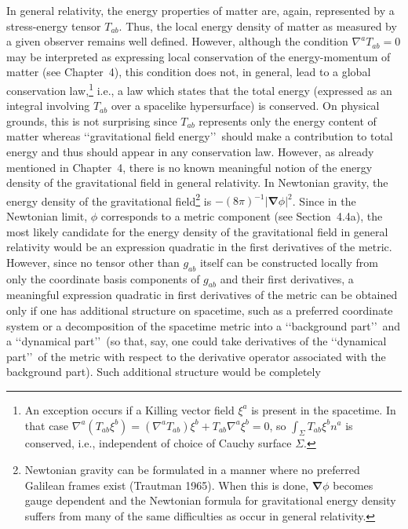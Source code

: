 In general relativity, the energy properties of matter are, again, represented by a
stress-energy tensor \(T_{ab}\). Thus, the local energy density of matter as measured
by a given observer remains well defined. However, although the condition
\(\nabla^aT_{ab}=0\) may be interpreted as expressing local conservation of the
energy-momentum of matter (see Chapter~4), this condition does not, in general, lead
to a global conservation law,\footnote{An exception occurs if a Killing vector field
\(\xi^a\) is present in the spacetime. In that case
\(\nabla^a(T_{ab}\xi^b)=(\nabla^aT_{ab})\xi^b+T_{ab}\nabla^a\xi^b=0\), so
\(\int_\Sigma T_{ab}\xi^bn^a\) is conserved, i.e., independent of choice of Cauchy
surface \(\Sigma\).} i.e., a law which states that the total energy (expressed as an
integral involving \(T_{ab}\) over a spacelike hypersurface) is conserved. On
physical grounds, this is not surprising since \(T_{ab}\) represents only the energy
content of matter whereas \lq\lq gravitational field energy\rq\rq\ should make a
contribution to total energy and thus should appear in any conservation law. However,
as already mentioned in Chapter~4, there is no known meaningful notion of the
energy density of the gravitational field in general relativity. In Newtonian gravity,
the energy density of the gravitational field\footnote{Newtonian gravity can be
formulated in a manner where no preferred Galilean frames exist (Trautman 1965).
When this is done, \(\boldsymbol{\nabla}\phi\) becomes gauge dependent and the Newtonian
formula for gravitational energy density suffers from many of the same difficulties
as occur in general relativity.} is
\(-(8\pi)^{-1}|\boldsymbol{\nabla}\phi|^2\). Since in the Newtonian limit, \(\phi\)
corresponds to a metric component (see Section~4.4a), the most likely candidate for
the energy density of the gravitational field in general relativity would be an
expression quadratic in the first derivatives of the metric. However, since no tensor
other than \(g_{ab}\) itself can be constructed locally from only the coordinate basis
components of \(g_{ab}\) and their first derivatives, a meaningful expression
quadratic in first derivatives of the metric can be obtained only if one has
additional structure on spacetime, such as a preferred coordinate system or a
decomposition of the spacetime metric into a \lq\lq background part\rq\rq\ and a
\lq\lq dynamical part\rq\rq\ (so that, say, one could take derivatives of the
\lq\lq dynamical part\rq\rq\ of the metric with respect to the derivative operator
associated with the background part). Such additional structure would be completely
